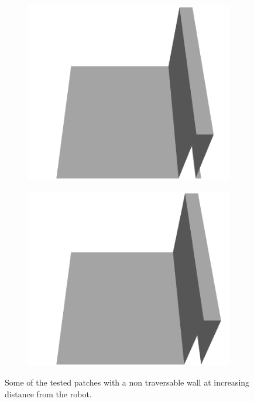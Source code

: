\begin{figure}[H]
\begin{subfigure}[b]{0.24\textwidth}
    \includegraphics[width=\linewidth]{../img/5/custom_patches/walls_front/all/21-3d.png}
    \end{subfigure}
    \begin{subfigure}[b]{0.24\textwidth}
    \includegraphics[width=\linewidth]{../img/5/custom_patches/walls_front/all/24-3d.png}
    \end{subfigure}
    \caption{Some of the tested patches with a non traversable wall at increasing distance from the robot.}
    \end{figure}
